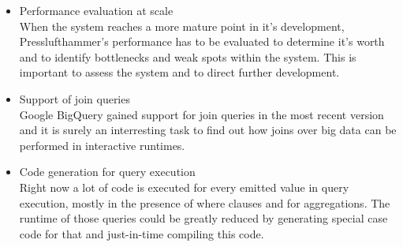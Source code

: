\begin{itemize}
    \item Performance evaluation at scale\\
      When the system reaches a more mature point in it's development,
      Presslufthammer's performance has to be evaluated to determine it's worth
      and to identify bottlenecks and weak spots within the system. This is
      important to assess the system and to direct further development.

    \item Support of join queries\\
      Google BigQuery gained support for join queries in the most recent
      version and it is surely an interresting task to find out how
      joins over big data can be performed in interactive runtimes.
    
    \item Code generation for query execution\\
      Right now a lot of code is executed for every emitted value in
      query execution, mostly in the presence of where clauses and for
      aggregations. The runtime of those queries could be greatly
      reduced by generating special case code for that and just-in-time
      compiling this code.
    
  \end{itemize}


